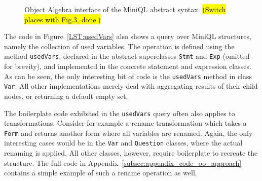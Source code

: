 \begin{figure}[t]
\nocaptionrule
\caption{Object Algebra interface of the MiniQL abstract syntax. \hl{(Switch places with Fig.3, done.)}}
\vspace{-.1in}
\label{ql_tree}
\end{figure}


The code in Figure~\ref{LST:usedVars} also shows a query over MiniQL structures, namely the collection of used variables.
The operation is defined using the method \lstinline{usedVars}, declared in the abstract superclasses  \lstinline{Stmt} and \lstinline{Exp} (omitted for brevity), and implemented in the concrete statement and expression classes.
As can be seen, the only interesting bit of code is the \lstinline{usedVars} method in class \lstinline{Var}.
All other implementations merely deal with aggregating results of their child nodes, or returning a default empty set.

The boilerplate code exhibited in the \lstinline{usedVars} query often
also applies to transformations.  Consider for example a rename
transformation which takes a \lstinline{Form} and returns another form
where all variables are renamed.  Again, the only interesting cases would be
in the \lstinline{Var} and {\small\texttt{Question}} classes, where the actual renaming is
applied. All other classes, however, require boilerplate to recreate
the structure. The full code in
Appendix~\ref{subsec:appendix_code_oo_approach} contains a simple
example of such a rename operation as well.



